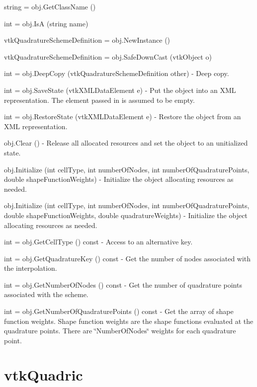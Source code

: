 \begin{DoxyItemize}
\item {\ttfamily string = obj.\-Get\-Class\-Name ()}  
\item {\ttfamily int = obj.\-Is\-A (string name)}  
\item {\ttfamily vtk\-Quadrature\-Scheme\-Definition = obj.\-New\-Instance ()}  
\item {\ttfamily vtk\-Quadrature\-Scheme\-Definition = obj.\-Safe\-Down\-Cast (vtk\-Object o)}  
\item {\ttfamily int = obj.\-Deep\-Copy (vtk\-Quadrature\-Scheme\-Definition other)} -\/ Deep copy.  
\item {\ttfamily int = obj.\-Save\-State (vtk\-X\-M\-L\-Data\-Element e)} -\/ Put the object into an X\-M\-L representation. The element passed in is assumed to be empty.  
\item {\ttfamily int = obj.\-Restore\-State (vtk\-X\-M\-L\-Data\-Element e)} -\/ Restore the object from an X\-M\-L representation.  
\item {\ttfamily obj.\-Clear ()} -\/ Release all allocated resources and set the object to an unitialized state.  
\item {\ttfamily obj.\-Initialize (int cell\-Type, int number\-Of\-Nodes, int number\-Of\-Quadrature\-Points, double shape\-Function\-Weights)} -\/ Initialize the object allocating resources as needed.  
\item {\ttfamily obj.\-Initialize (int cell\-Type, int number\-Of\-Nodes, int number\-Of\-Quadrature\-Points, double shape\-Function\-Weights, double quadrature\-Weights)} -\/ Initialize the object allocating resources as needed.  
\item {\ttfamily int = obj.\-Get\-Cell\-Type () const} -\/ Access to an alternative key.  
\item {\ttfamily int = obj.\-Get\-Quadrature\-Key () const} -\/ Get the number of nodes associated with the interpolation.  
\item {\ttfamily int = obj.\-Get\-Number\-Of\-Nodes () const} -\/ Get the number of quadrature points associated with the scheme.  
\item {\ttfamily int = obj.\-Get\-Number\-Of\-Quadrature\-Points () const} -\/ Get the array of shape function weights. Shape function weights are the shape functions evaluated at the quadrature points. There are \char`\"{}\-Number\-Of\-Nodes\char`\"{} weights for each quadrature point.  
\end{DoxyItemize}\hypertarget{vtkcommon_vtkquadric}{}\section{vtk\-Quadric}\label{vtkcommon_vtkquadric}
